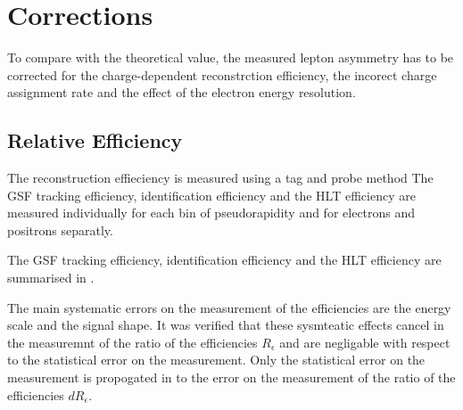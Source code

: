 \section{Corrections}

To compare with the theoretical value, the measured lepton asymmetry has to be
corrected for the charge-dependent reconstrction efficiency, the incorect charge
assignment rate and the effect of the electron energy resolution.

\subsection{Relative Efficiency}
The reconstruction effieciency is measured using a tag and probe method\cite{}
The \ac{GSF} tracking efficiency,
identification efficiency and the \ac{HLT} efficiency are measured individually
for each bin of pseudorapidity and for electrons and positrons separatly. 

The \ac{GSF} tracking efficiency, identification efficiency and the \ac{HLT}
efficiency are summarised in .

The main systematic errors on the measurement of the efficiencies are the energy
scale and the signal shape. It was verified that these sysmteatic effects cancel
in the measuremnt of the ratio of the efficiencies $R_{\epsilon}$ and are
negligable with respect to the statistical error on the measurement. Only the
statistical error on the measurement is propogated in to the error on the
measurement of the ratio of the efficiencies $dR_{\epsilon}$.


